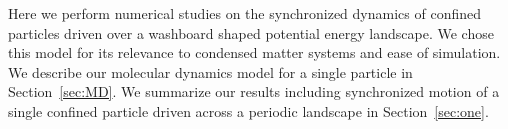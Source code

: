 \documentclass[twocolumn,preprintnumbers,amsmath,amssymb,aps,prx]{revtex4}
\begin{document}

Here we perform numerical studies 
on the synchronized dynamics
of confined particles driven over
a washboard shaped potential energy landscape.
We chose this model for its
relevance to condensed matter systems
and ease of simulation.
We describe
our molecular dynamics model for a single particle in Section~\ref{sec:MD}.
We summarize
our results 
including synchronized motion of a single confined particle
driven across a periodic landscape in 
Section~\ref{sec:one}.
\end{document}

